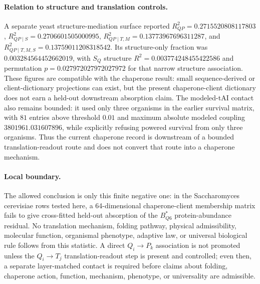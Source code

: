 \paragraph{Relation to structure and translation controls.}
A separate yeast structure-mediation surface reported $R^2_{QP}=0.2715520808117803$, $R^2_{QP\mid S}=0.2706601505000995$, $R^2_{QP\mid T,M}=0.13773967696311287$, and $R^2_{QP\mid T,M,S}=0.13759011208318542$.  Its structure-only fraction was $0.003284564452662019$, with $S_Q$ structure $R^2=0.003774248455422586$ and permutation $p=0.027972027972027972$ for that narrow structure association.  These figures are compatible with the chaperone result: small sequence-derived or client-dictionary projections can exist, but the present chaperone-client dictionary does not earn a held-out downstream absorption claim.  The modeled-tAI contact also remains bounded: it used only three organisms in the earlier survival matrix, with $81$ entries above threshold $0.01$ and maximum absolute modeled coupling $3801961.031607896$, while explicitly refusing powered survival from only three organisms.  Thus the current chaperone record is downstream of a bounded translation-readout route and does not convert that route into a chaperone mechanism.

\paragraph{Local boundary.}
The allowed conclusion is only this finite negative one: in the Saccharomyces cerevisiae rows tested here, a 64-dimensional chaperone-client membership matrix fails to give cross-fitted held-out absorption of the $B^*_{Q6}$ protein-abundance residual.  No translation mechanism, folding pathway, physical admissibility, molecular function, organismal phenotype, adaptive law, or universal biological rule follows from this statistic.  A direct $Q_i\to P_k$ association is not promoted unless the $Q_i\to T_j$ translation-readout step is present and controlled; even then, a separate layer-matched contact is required before claims about folding, chaperone action, function, mechanism, phenotype, or universality are admissible.